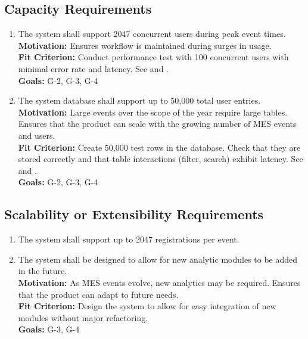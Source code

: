 \documentclass[12pt]{article}
\begin{document}
\subsection{Capacity Requirements}
\begin{enumerate}[label=\bfseries CR-\arabic*:, wide=0pt, leftmargin=*]
  \item The system shall support 2047 concurrent users during peak event times.\\
  {\bf Motivation:} Ensures workflow is maintained during surges in usage.\\
  {\bf Fit Criterion:} Conduct performance test with 100 concurrent users with minimal error rate and latency. See \label{PR1} and \label{PR2}.\\
  {\bf Goals:} G-2, G-3, G-4
  \item The system database shall support up to 50,000 total user entries.\\
  {\bf Motivation:} Large events over the scope of the year require large tables. Ensures that the product can scale with the growing number of MES events and users.\\
  {\bf Fit Criterion:} Create 50,000 test rows in the database. Check that they are stored correctly and that table interactions (filter, search) exhibit latency. See \label{PR1} and \label{PR2}.\\
  {\bf Goals:} G-2, G-3, G-4
\end{enumerate}

\subsection{Scalability or Extensibility Requirements}
\begin{enumerate}[label=\bfseries SE-\arabic*:, wide=0pt, leftmargin=*, ref=\bfseries SE-\arabic*]
  \item \label{SE1} The system shall support up to 2047 registrations per event.
  \item \label{SE2} The system shall be designed to allow for new analytic modules to be added in the future.\\
  {\bf Motivation:} As MES events evolve, new analytics may be required. Ensures that the product can adapt to future needs.\\
  {\bf Fit Criterion:} Design the system to allow for easy integration of new modules without major refactoring.\\
  {\bf Goals:} G-3, G-4
\end{enumerate}
\end{document}
